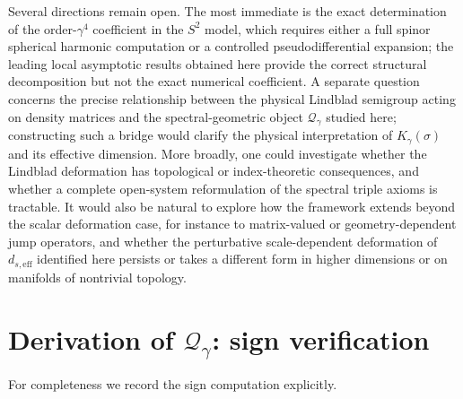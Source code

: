 \documentclass[11pt,a4paper]{article}
\numberwithin{equation}{section}
\theoremstyle{definition}
\newcommand{\Qg}{\mathcal{Q}_\gamma}
\begin{document}
Several directions remain open. The most immediate is the exact
determination of the order-$\gamma^4$ coefficient in the $S^2$ model,
which requires either a full spinor spherical harmonic computation or a
controlled pseudodifferential expansion; the leading local asymptotic
results obtained here provide the correct structural decomposition but
not the exact numerical coefficient. A separate question concerns the
precise relationship between the physical Lindblad semigroup acting on
density matrices and the spectral-geometric object $\Qg$ studied here;
constructing such a bridge would clarify the physical interpretation of
$K_\gamma(\sigma)$ and its effective dimension. More broadly, one could
investigate whether the Lindblad deformation has topological or
index-theoretic consequences, and whether a complete open-system
reformulation of the spectral triple axioms is tractable. It would also
be natural to explore how the framework extends beyond the scalar
deformation case, for instance to matrix-valued or geometry-dependent
jump operators, and whether the perturbative scale-dependent deformation of
$d_{s,\mathrm{eff}}$ identified here persists or takes a different form in
higher dimensions or on manifolds of nontrivial topology.

\appendix

\section{Derivation of $\mathcal{Q}_\gamma$:
  sign verification}
\label{app:signs}

For completeness we record the sign computation explicitly.
\end{document}
